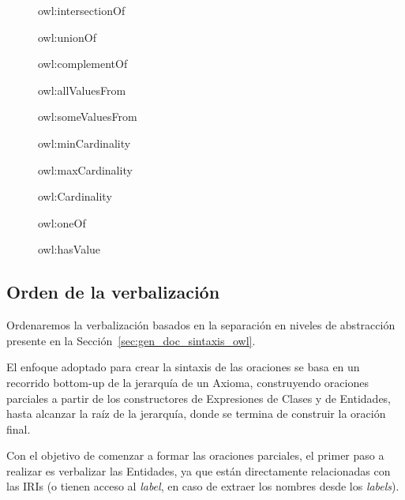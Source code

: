 \begin{figure}
\label{list:constructores_expresiones}
    \begin{itemize}
    \begin{multicols}{2}
        \item owl:intersectionOf
        \item owl:unionOf
        \item owl:complementOf
        \item owl:allValuesFrom
        \item owl:someValuesFrom 
        \item owl:minCardinality
        \item owl:maxCardinality
        \item owl:Cardinality
        \item owl:oneOf
        \item owl:hasValue
        \end{multicols}
    \end{itemize}
\end{figure}

\subsection{Orden de la verbalización}
Ordenaremos la verbalización basados en la separación en niveles de abstracción presente en la Sección~\ref{sec:gen_doc_sintaxis_owl}. 

El enfoque adoptado para crear la sintaxis de las oraciones se basa en un recorrido bottom-up de la jerarquía de un Axioma, construyendo oraciones parciales a partir de los constructores de Expresiones de Clases y de Entidades, hasta alcanzar la raíz de la jerarquía, donde se termina de construir la oración final. 

Con el objetivo de comenzar a formar las oraciones parciales, el primer paso a realizar es verbalizar las Entidades, ya que están directamente relacionadas con las IRIs (o tienen acceso al \emph{label}, en caso de extraer los nombres desde los \emph{labels}).

